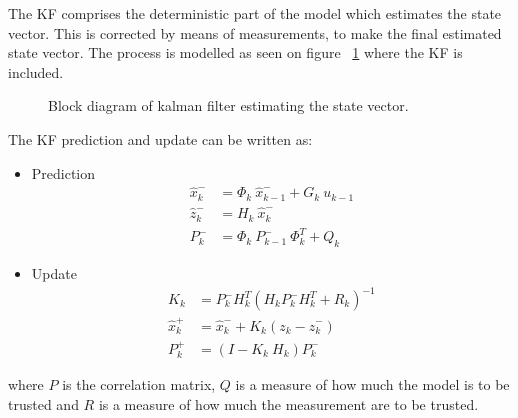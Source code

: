 The \ac{KF} comprises the deterministic part of the model which estimates the state vector. This is corrected by means of measurements, to make the final estimated state vector. The process is modelled as seen on figure ~\ref{fig:blockkf} where the \ac{KF} is included.

\begin{figure}
	\centering
	
	\caption{Block diagram of kalman filter estimating the state vector.}
	\label{fig:blockkf}
\end{figure}

The \ac{KF} prediction and update can be written as:
\begin{itemize}
\item Prediction
\begin{align}
\hat x_{k}^- &= \Phi_{k}\ \hat x_{k-1}^- + G_{k}\ u_{k-1}\nonumber\\
\hat z_{k}^- &= H_{k}\ \hat x_{k}^-\nonumber\\
P_{k}^- &= \Phi_{k}\ P_{k-1}^-\ \Phi_{k}^T + Q_{k}\nonumber
\end{align}

\item Update
\begin{align}
K_{k} &= P_{k}^- H_{k}^T(H_{k} P_{k}^- H_{k}^T+R_{k})^{-1}\nonumber\\
\hat x_{k}^+ &= \hat x_{k}^- + K_{k}(z_{k}-\hat z_{k}^-)\nonumber\\
P_{k}^+ &= (I-K_{k}\ H_{k})P_{k}^-\nonumber
\end{align}
\end{itemize}
where $P$ is the correlation matrix, $Q$ is a measure of how much the model is to be trusted and $R$ is a measure of how much the measurement are to be trusted.